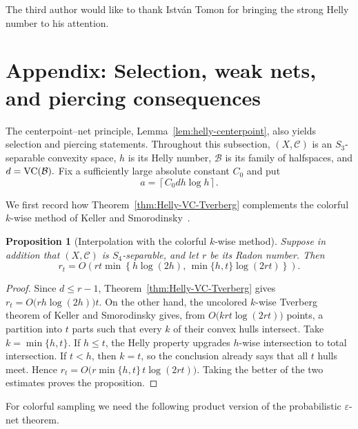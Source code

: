\documentclass[11pt]{article}
\newtheorem{prop}[thm]{Proposition}
\theoremstyle{definition}
\newcommand{\C}{\mathcal{C}}
\newcommand{\B}{\mathcal{B}}
\newcommand{\VC}{\textup{VC}}
\begin{document}
The third author would like to thank Istv\'an Tomon for bringing the strong Helly number to his attention.





\appendix
\section{Appendix: Selection, weak nets, and piercing consequences}
\label{subsec:separable:consequences}

The centerpoint--net principle, Lemma~\ref{lem:helly-centerpoint}, also yields selection and piercing
statements.  Throughout this subsection, $(X,\C)$ is an
$S_3$-separable convexity space, $h$ is its Helly number, $\B$ is its
family of halfspaces, and
$d=\VC(\B).$
Fix a sufficiently large absolute constant $C_0$ and put
\begin{equation}\label{eq:selection-parameter}
a=\left\lceil C_0dh\log h\right\rceil.
\end{equation}

We first record how Theorem~\ref{thm:Helly-VC-Tverberg} complements
the colorful $k$-wise method of Keller and
Smorodinsky~\cite{keller2026colorful}.

\begin{prop}[Interpolation with the colorful $k$-wise method]
\label{prop:KS-interpolation}
Suppose in addition that $(X,\C)$ is $S_4$-separable, and let $r$ be
its Radon number.  Then
\[
r_t=O\left(
rt\min\left\{
h\log(2h),\,
\min\{h,t\}\log(2rt)
\right\}
\right).
\]
\end{prop}

\begin{proof}
Since $d\le r-1$, Theorem~\ref{thm:Helly-VC-Tverberg} gives
$r_t=O\bigl(rh\log(2h)\bigr)t.$
On the other hand, the uncolored $k$-wise Tverberg theorem of Keller
and Smorodinsky gives, from
$O\bigl(krt\log(2rt)\bigr)$
points, a partition into $t$ parts such that every $k$ of their convex
hulls intersect.  Take $k=\min\{h,t\}$.  If $h\le t$, the Helly
property upgrades $h$-wise intersection to total intersection.  If
$t<h$, then $k=t$, so the conclusion already says that all $t$ hulls
meet.  Hence
$r_t=O\bigl(r\min\{h,t\}\,t\log(2rt)\bigr).$
Taking the better of the two estimates proves the proposition.
\end{proof}

For colorful sampling we need the following product version of the
probabilistic $\varepsilon$-net theorem.
\end{document}
